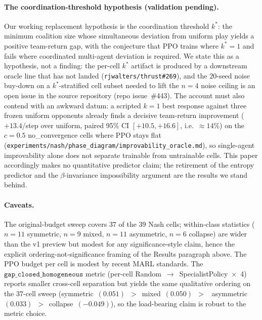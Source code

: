 \documentclass{anvil-paper}
\begin{document}
\paragraph{The coordination-threshold hypothesis (validation pending).}
Our working replacement hypothesis is the coordination threshold
$k^{*}$: the minimum coalition size whose simultaneous deviation from
uniform play yields a positive team-return gap, with the conjecture that
PPO trains where $k^{*}{=}1$ and fails where coordinated multi-agent
deviation is required. We state this as a hypothesis, not a finding: the
per-cell $k^{*}$ artifact is produced by a downstream oracle line that
has not landed (\texttt{rjwalters/thrust\#269}), and the $20$-seed noise
buy-down on a $k^{*}$-stratified cell subset needed to lift the $n{=}4$
noise ceiling is an open issue in the source repository (repo
issue~\#443). The account must also contend with an awkward datum: a
scripted $k{=}1$ best response against three frozen uniform opponents
already finds a decisive team-return improvement ($+13.4$/step over
uniform, paired 95\% CI $[+10.5, +16.6]$, i.e.\ ${\approx}14\%$) on the
$c{=}0.5$
\textsf{no\_convergence} cells where PPO stays flat
(\texttt{experiments/nash/phase\_diagram/improvability\_oracle.md}), so
single-agent improvability alone does not separate trainable from
untrainable cells. This paper accordingly makes no quantitative
predictor claim; the retirement of the entropy predictor and the
$\beta$-invariance impossibility argument are the results we stand
behind.

\paragraph{Caveats.}
The original-budget sweep covers $37$ of the $39$ Nash cells; within-class
statistics ($n{=}11$ symmetric, $n{=}9$ mixed, $n{=}11$ asymmetric,
$n{=}6$ collapse) are wider than the v1 preview but modest for any
significance-style claim, hence the explicit ordering-not-significance
framing of the Results paragraph above. The PPO budget per cell is
modest by recent MARL standards. The $\texttt{gap\_closed\_homogeneous}$
metric (per-cell Random~$\to$~SpecialistPolicy~$\times$~4) reports
smaller cross-cell separation but yields the same qualitative ordering
on the $37$-cell sweep
(\textsf{symmetric}~$(0.051)$~$>$~\textsf{mixed}~$(0.050)$~$>$~%
\textsf{asymmetric}~$(0.033)$~$>$~\textsf{collapse}~$(-0.049)$), so the
load-bearing claim is robust to the metric choice.
\end{document}
